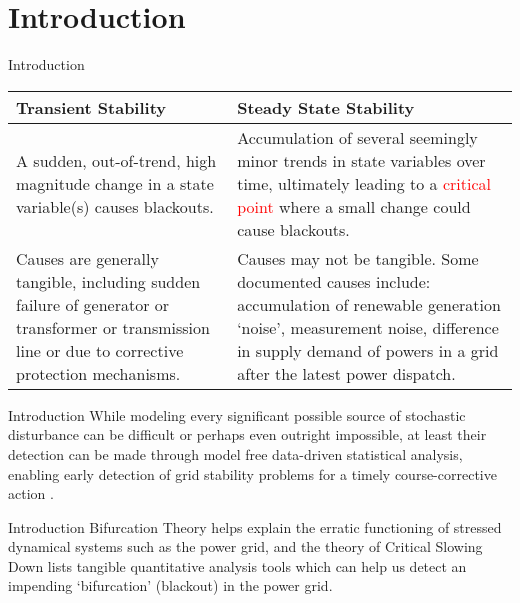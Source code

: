 \section[Introduction]{Introduction}
\label{sec:introduction}


\begin{frame}[fragile]{Introduction}
	\begin{tabularx}{\textwidth}{
			@{\hspace{1.5em}}%
			>{\leavevmode\raggedright}%
			X%
			@{\quad\hspace{1.5em}}%
			>{\leavevmode\raggedright\arraybackslash}%
			X%
			@{}%
		}
		\textbf{Transient Stability} & \textbf{Steady State Stability}\\
		\toprule
		A sudden, out-of-trend, high magnitude change in a state variable(s) causes blackouts. & 
		Accumulation of several seemingly minor trends in state variables over time, ultimately leading to a \textcolor{red}{critical point} where a small change could cause blackouts.\\
		Causes are generally tangible, including sudden failure of generator or transformer or transmission line or due to corrective protection mechanisms. &
		Causes may not be tangible. Some documented causes include: accumulation of renewable generation `noise', measurement noise, difference in supply demand of powers in a grid after the latest power dispatch.\\
		\bottomrule
	\end{tabularx}
\end{frame}

\begin{frame}{Introduction}
	While modeling every significant possible source of stochastic disturbance can be difficult or perhaps even outright impossible, at least their detection can be made through model free data-driven statistical analysis, enabling early detection of grid stability problems for a timely course-corrective action \cite{schafer01, sanchez01, ghanvati01}.
\end{frame}

\begin{frame}{Introduction}
	Bifurcation Theory \cite{nathanKutzNotesOnBifurcationTheoryAndNormalForms, rosehartBifurcationAnalysisOfVariousPowerSystemModels, chenBifurcationsAndChaosInEngineering, mohlerDyanmicsAndControlPartOne} helps explain the erratic functioning of stressed dynamical systems such as the power grid, and the theory of Critical Slowing Down \cite{schefferEarlyWarningSignalsForCriticalTransitions} lists tangible quantitative analysis tools which can help us detect an impending `bifurcation' (blackout) in the power grid.
\end{frame}

